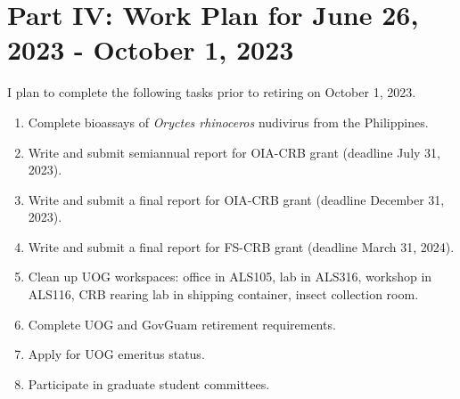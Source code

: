 \newpage

\section{Part IV: Work Plan for June 26, 2023 - October 1, 2023}

I plan to complete the following tasks prior to retiring on October 1, 2023.

\begin{enumerate}
	\item Complete bioassays of \textit{Oryctes rhinoceros} nudivirus from the Philippines.
	\item Write and submit semiannual report for OIA-CRB grant (deadline July 31, 2023).
	\item Write and submit a final report for OIA-CRB grant (deadline December 31, 2023). 
	\item Write and submit a final report for FS-CRB grant (deadline March 31, 2024).
	\item Clean up UOG workspaces: office in ALS105, lab in ALS316, workshop in ALS116, CRB rearing lab in shipping container, insect collection room.
	\item Complete UOG and GovGuam retirement requirements.
	\item Apply for UOG emeritus status.
	\item Participate in graduate student committees.	
\end{enumerate}

